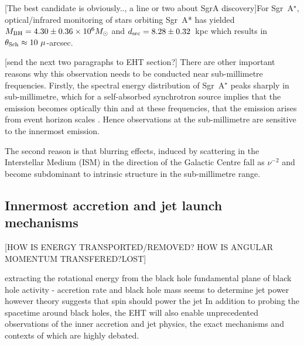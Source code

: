 [The best candidate is obviously.., a line or two about SgrA discovery]For Sgr~A$^\star$, optical/infrared monitoring of stars orbiting Sgr~A* \citep{Gillessen_2009} has yielded ${M_{\rm BH} = 4.30 \pm 0.36 \times 10^{6} M_\odot}$ and ${d_{\rm src}= 8.28 \pm 0.32}$~kpc which results in ${\theta_{\rm Sch} \approx 10\ \mu}$-arcsec. 

[send the next two paragraphs to EHT section?]
There are other important reasons why this observation needs to be conducted near sub-millimetre frequencies. Firstly, the spectral energy distribution of Sgr~A$^\star$ peaks sharply in sub-millimetre, which for a self-absorbed synchrotron source  implies that the emission becomes optically thin and at these frequencies, that the emission arises from event horizon scales \citep{Serabyn_1997,Falcke_1998}. Hence observations at the sub-millimetre are sensitive to the innermost emission.

The second reason is that blurring effects, induced by scattering in the Interstellar Medium (ISM) in the direction of the Galactic Centre \citep[e.g.][]{Fish_2014} fall as $\nu^{-2}$ and become subdominant to intrinsic structure in the sub-millimetre range.



\subsection{Innermost accretion and jet launch mechanisms}

[HOW IS ENERGY TRANSPORTED/REMOVED? HOW IS ANGULAR MOMENTUM TRANSFERED?LOST]

extracting the rotational energy from the black hole
fundamental plane of black hole activity - accretion rate and black hole mass seems to determine jet power however theory suggests that spin should power the jet
In addition to probing the spacetime around black holes, the EHT will also enable unprecedented observations of the inner accretion and jet physics, the exact mechanisms and contexts of which are highly debated.


